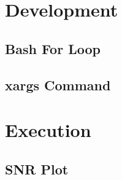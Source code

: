 \documentclass{article}
\begin{document}
\clearpage

\section{Development}
\label{sec:development}



\subsection{Bash For Loop}
\label{sec:bash-for-loop}



\subsection{xargs Command}
\label{sec:xargs-command}



\section{Execution}
\label{sec:execution}

\subsection{SNR Plot}
\label{sec:snr-plot}
\end{document}
